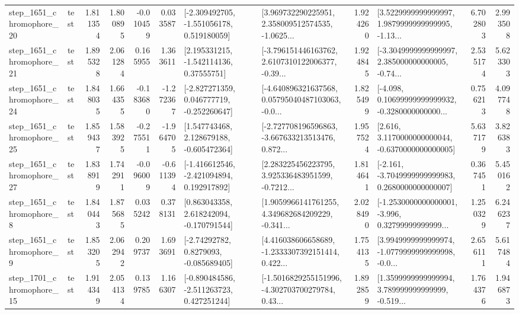 \begin{tabular}{llrrrrllrlrr}
 step\_1651\_chromophore\_20 &      test &      1.811354 &    1.800895 &     -0.010459 &  0.033587 &   [-2.309492705, -1.551056178, 0.519180059] &  [3.969732290225951, 2.358009512574535, -1.0625... &       1.924260 &  [3.5229999999999997, 1.9879999999999995, -1.13... &            6.702803 &          2.993508 \\
 step\_1651\_chromophore\_21 &      test &      1.895328 &    2.061284 &      0.165955 &  1.363611 &     [2.195331215, -1.542114136, 0.37555751] &  [-3.796151446163762, 2.6107310122006377, -0.39... &       1.924845 &  [-3.3049999999999997, 2.385000000000005, -0.74... &            2.535174 &          5.623303 \\
 step\_1651\_chromophore\_24 &      test &      1.848035 &    1.664355 &     -0.183680 & -1.272367 &   [-2.827271359, 0.046777719, -0.252260647] &  [-4.640896321637568, 0.05795040487103063, -0.0... &       1.825499 &  [-4.098, 0.10699999999999932, -0.3280000000000... &            0.756213 &          4.097748 \\
 step\_1651\_chromophore\_25 &      test &      1.859437 &    1.583925 &     -0.275511 & -1.964705 &    [1.547743468, 2.128679188, -0.605472364] &  [-2.727708196596863, -3.667633213513476, 0.872... &       1.957524 &   [2.616, 3.1170000000000044, -0.6370000000000005] &            5.637179 &          3.826383 \\
 step\_1651\_chromophore\_27 &      test &      1.838919 &    1.742911 &     -0.096009 & -0.611394 &   [-1.416612546, -2.421094894, 0.192917892] &  [2.283225456223795, 3.925336483951599, -0.7212... &       1.814641 &  [-2.161, -3.7049999999999983, 0.2680000000000007] &            0.367451 &          5.450162 \\
  step\_1651\_chromophore\_8 &      test &      1.840443 &    1.875685 &      0.035242 &  0.378131 &    [0.863043358, 2.618242094, -0.170791544] &  [1.9059966141761255, 4.349682684209229, -0.341... &       2.028490 &  [-1.2530000000000001, -3.996, 0.32799999999999... &            1.250329 &          6.246237 \\
  step\_1651\_chromophore\_9 &      test &      1.853205 &    2.062942 &      0.209737 &  1.693691 &      [-2.74292782, 0.8279093, -0.085689405] &  [4.416038606658689, -1.2333307392151414, 0.422... &       1.754135 &  [3.9949999999999974, -1.0779999999999998, -0.0... &            2.656111 &          5.617484 \\
 step\_1701\_chromophore\_15 &      test &      1.914349 &    2.054134 &      0.139785 &  1.166307 &   [-0.890484586, -2.511263723, 0.427251244] &  [-1.5016829255151996, -4.302703700279784, 0.43... &       1.892859 &  [1.3599999999999994, 3.789999999999999, -0.519... &            1.764376 &          1.946873 \\

\end{tabular}
